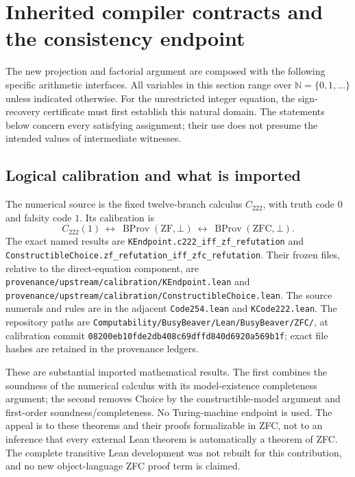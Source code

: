 \section{Inherited compiler contracts and the consistency endpoint}
\label{sec:inherited-compiler-contracts}

The new projection and factorial argument are composed with the following
specific arithmetic interfaces.  All variables in this section range over
$\mathbb N=\{0,1,\ldots\}$ unless indicated otherwise.  For the unrestricted
integer equation, the sign-recovery certificate must first establish this
natural domain.  The statements below concern every satisfying assignment;
their use does not presume the intended values of intermediate witnesses.

\subsection{Logical calibration and what is imported}

The numerical source is the fixed twelve-branch calculus $C_{222}$, with
truth code $0$ and falsity code $1$.  Its calibration is
\[
 C_{222}(1)
 \ \longleftrightarrow\
 \operatorname{BProv}(\mathrm{ZF},\bot)
 \ \longleftrightarrow\
 \operatorname{BProv}(\mathrm{ZFC},\bot).
\]
The exact named results are
\nolinkurl{KEndpoint.c222_iff_zf_refutation} and
\nolinkurl{ConstructibleChoice.zf_refutation_iff_zfc_refutation}.
Their frozen files, relative to the direct-equation component, are
\nolinkurl{provenance/upstream/calibration/KEndpoint.lean} and
\nolinkurl{provenance/upstream/calibration/ConstructibleChoice.lean}.
The source numerals and rules are in the adjacent
\nolinkurl{Code254.lean} and \nolinkurl{KCode222.lean}.
The repository paths are
\nolinkurl{Computability/BusyBeaver/Lean/BusyBeaver/ZFC/}, at calibration
commit \nolinkurl{08200eb10fde2db408c69dffd840d6920a569b1f}; exact file hashes
are retained in the provenance ledgers.

These are substantial imported mathematical results.  The first combines
the soundness of the numerical calculus with its model-existence
completeness argument; the second removes Choice by the constructible-model
argument and first-order soundness/completeness.  No Turing-machine endpoint
is used.  The appeal is to these theorems and their proofs formalizable in
ZFC, not to an inference that every external Lean theorem is automatically
a theorem of ZFC.  The complete transitive Lean development was not rebuilt
for this contribution, and no new object-language ZFC proof term is claimed.


